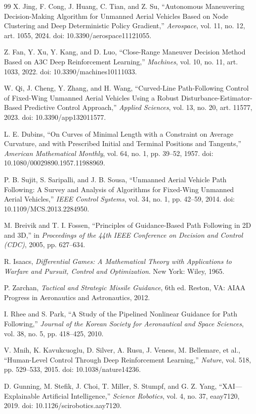 \documentclass[drones,article,submit,pdftex,moreauthors]{Definitions/mdpi}
\begin{document}
\begin{thebibliography}{99}
X. Jing, F. Cong, J. Huang, C. Tian, and Z. Su,
``Autonomous Maneuvering Decision-Making Algorithm for Unmanned Aerial Vehicles Based on Node Clustering and Deep Deterministic Policy Gradient,''
\emph{Aerospace}, vol. 11, no. 12, art. 1055, 2024.
doi: 10.3390/aerospace11121055.

Z. Fan, Y. Xu, Y. Kang, and D. Luo,
``Close-Range Maneuver Decision Method Based on A3C Deep Reinforcement Learning,''
\emph{Machines}, vol. 10, no. 11, art. 1033, 2022.
doi: 10.3390/machines10111033.

W. Qi, J. Cheng, Y. Zhang, and H. Wang,
``Curved-Line Path-Following Control of Fixed-Wing Unmanned Aerial Vehicles Using a Robust Disturbance-Estimator-Based Predictive Control Approach,''
\emph{Applied Sciences}, vol. 13, no. 20, art. 11577, 2023.
doi: 10.3390/app132011577.

L. E. Dubins,
``On Curves of Minimal Length with a Constraint on Average Curvature, and with Prescribed Initial and Terminal Positions and Tangents,''
\emph{American Mathematical Monthly}, vol. 64, no. 1, pp. 39--52, 1957.
doi: 10.1080/00029890.1957.11988969.

P. B. Sujit, S. Saripalli, and J. B. Sousa,
``Unmanned Aerial Vehicle Path Following: A Survey and Analysis of Algorithms for Fixed-Wing Unmanned Aerial Vehicles,''
\emph{IEEE Control Systems}, vol. 34, no. 1, pp. 42--59, 2014.
doi: 10.1109/MCS.2013.2284950.

M. Breivik and T. I. Fossen,
``Principles of Guidance-Based Path Following in 2D and 3D,''
in \emph{Proceedings of the 44th IEEE Conference on Decision and Control (CDC)}, 2005, pp. 627--634.

R. Isaacs,
\emph{Differential Games: A Mathematical Theory with Applications to Warfare and Pursuit, Control and Optimization}.
New York: Wiley, 1965.

P. Zarchan,
\emph{Tactical and Strategic Missile Guidance}, 6th ed.
Reston, VA: AIAA Progress in Aeronautics and Astronautics, 2012.

I. Rhee and S. Park,
``A Study of the Pipelined Nonlinear Guidance for Path Following,''
\emph{Journal of the Korean Society for Aeronautical and Space Sciences}, vol. 38, no. 5, pp. 418--425, 2010.

V. Mnih, K. Kavukcuoglu, D. Silver, A. Rusu, J. Veness, M. Bellemare, et al.,
``Human-Level Control Through Deep Reinforcement Learning,''
\emph{Nature}, vol. 518, pp. 529--533, 2015.
doi: 10.1038/nature14236.

D. Gunning, M. Stefik, J. Choi, T. Miller, S. Stumpf, and G. Z. Yang,
``XAI---Explainable Artificial Intelligence,''
\emph{Science Robotics}, vol. 4, no. 37, eaay7120, 2019.
doi: 10.1126/scirobotics.aay7120.

\end{thebibliography}
\end{document}
